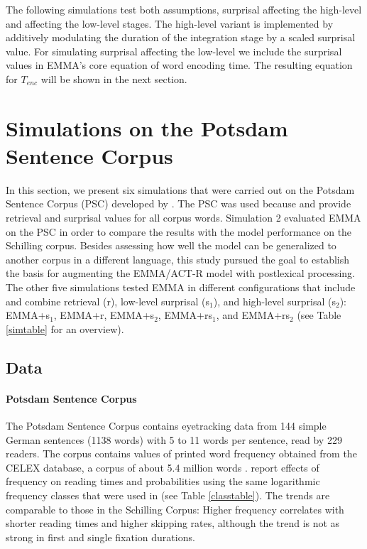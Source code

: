 \documentclass{cambridge7A}\usepackage[]{graphicx}\usepackage[]{color}
\begin{document}
The following simulations test both assumptions, surprisal affecting the  high-level and affecting the  low-level stages.  The high-level variant is implemented by additively modulating the duration of the integration stage by a scaled surprisal value. For simulating surprisal affecting the low-level we include the surprisal values in EMMA's core equation of word encoding time. The resulting equation for $T_{enc}$ will be shown in the next section.

\section{Simulations on the Potsdam Sentence Corpus} \label{sec:topics:psc}

In this section, we present six simulations that were carried out on the Potsdam Sentence Corpus (PSC) developed by \cite{Kliegl2004}. The PSC was used because \cite{jemrsurprisal} and \cite{BostonHaleVasishth2011} provide retrieval and surprisal values for all corpus words.  Simulation 2 evaluated EMMA on the PSC in order to compare the results with the model performance on the Schilling corpus.  Besides assessing how well the model can be generalized to another corpus in a different language, this study pursued the goal to establish the basis for augmenting the EMMA/ACT-R model with postlexical processing. 
The other five simulations tested EMMA in different configurations that include and combine retrieval (r), low-level surprisal (s$_1$), and high-level surprisal (s$_2$): EMMA+s$_1$, EMMA+r, EMMA+s$_2$, EMMA+rs$_1$, and EMMA+rs$_2$ (see Table \ref{simtable} for an overview).

\subsection{Data}
\paragraph{Potsdam Sentence Corpus}
The Potsdam Sentence Corpus contains eyetracking data from 144 simple German sentences (1138 words) with 5 to 11 words per sentence, read by 229 readers. 
The corpus contains values of printed word frequency obtained from the  CELEX database, a corpus of about 5.4 million words \citep{Baayen1993}.
\cite{Kliegl2004} report effects of frequency on reading times and probabilities using the same logarithmic frequency classes that were used in \cite{Salvucci2001} (see Table \ref{classtable}). The trends are comparable to those in the  Schilling Corpus: Higher frequency correlates with shorter reading times and higher skipping rates, although the trend is not as strong in first and single fixation durations. 
\end{document}
